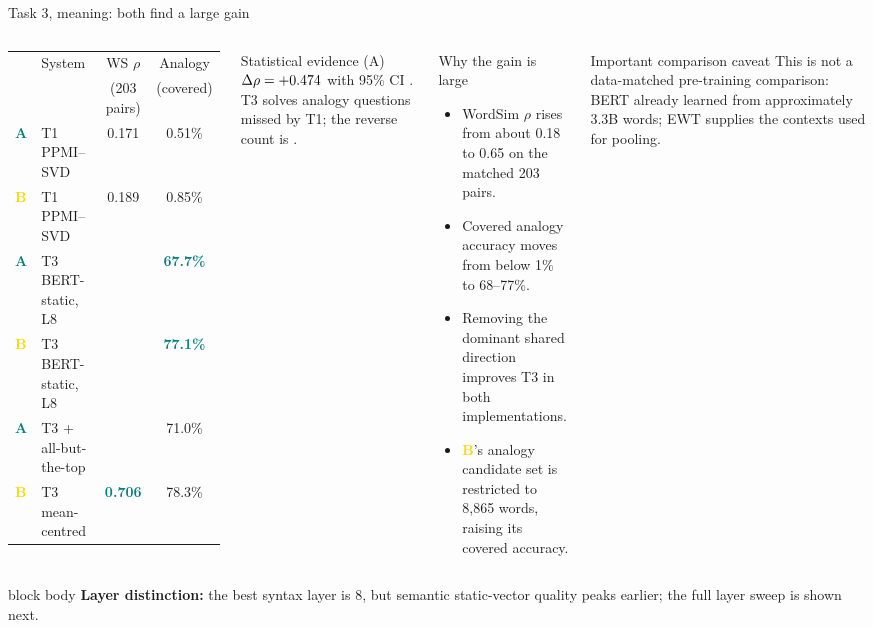 \documentclass[aspectratio=169,9pt,t]{beamer}
\newcommand{\hl}[1]{\textcolor{Teal}{\bfseries #1}}
\newcommand{\A}{\textcolor{Teal}{\bfseries A}}
\newcommand{\B}{\textcolor{Gold}{\bfseries B}}
\newcommand{\tightitem}{\setlength{\itemsep}{0.12em}\setlength{\parskip}{0pt}\setlength{\topsep}{0.08em}}
\begin{document}
\begin{frame}{Task 3, meaning: both find a large gain}
\begin{columns}[T,onlytextwidth]
\footnotesize
\begin{tabular}{@{}llcc@{}}
\toprule
 & System & WS $\rho$ & Analogy \\
 & & (203 pairs) & (covered) \\
\midrule
\A & T1 PPMI--SVD & 0.171 & 0.51\% \\
\B & T1 PPMI--SVD & 0.189 & 0.85\% \\
\midrule
\A & T3 BERT-static, L8 & \hl{\XTThreeSub} & \hl{67.7\%} \\
\B & T3 BERT-static, L8 & \hl{\BTSameWS} & \hl{77.1\%} \\
\midrule
\A & T3 + all-but-the-top & \hl{\XTThreeASub} & 71.0\% \\
\B & T3 mean-centred & \hl{0.706} & 78.3\% \\
\bottomrule
\end{tabular}
\vspace{0.2em}
\begin{exampleblock}{Statistical evidence (A)}
\scriptsize $\Delta\rho=+0.474$ with 95\% CI \PtWSCI. T3 solves \PtANOnlyA{} analogy questions missed by T1; the reverse count is \PtANOnlyB.
\end{exampleblock}
\begin{block}{Why the gain is large}
\small
\begin{itemize}\tightitem
\item WordSim $\rho$ rises from about 0.18 to 0.65 on the matched 203 pairs.
\item Covered analogy accuracy moves from below 1\% to 68--77\%.
\item Removing the dominant shared direction improves T3 in both implementations.
\item \B's analogy candidate set is restricted to 8,865 words, raising its covered accuracy.
\end{itemize}
\end{block}
\begin{alertblock}{Important comparison caveat}
\small This is not a data-matched pre-training comparison: BERT already learned from approximately 3.3B words; EWT supplies the contexts used for pooling.
\end{alertblock}
\end{columns}
\vspace{0.2em}
\begin{beamercolorbox}[rounded=true,sep=0.65ex,wd=\linewidth]{block body}
\scriptsize\textbf{Layer distinction:} the best syntax layer is 8, but semantic static-vector quality peaks earlier; the full layer sweep is shown next.
\end{beamercolorbox}
\end{frame}
\end{document}
